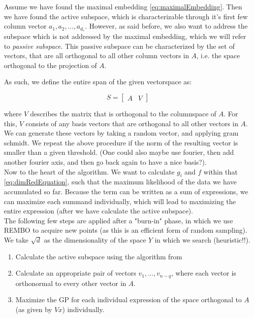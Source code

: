 Assume we have found the maximal embedding \ref{eq:maximalEmbedding}.
Then we have found the active subspace, which is characterizable through it's first few column vector $  a_1, a_2, ..., a_{d_e} $.
However, as said before, we also want to address the subspace which is not addressed by the maximal embedding, which we will refer to \textit{passive subspace}.
This passive subspace can be characterized by the set of vectors, that are all orthogonal to all other column vectors in $A$, i.e. the space orthogonal to the projection of $A$.

As such, we define the entire span of the given vectorspace as:

\begin{equation}
S = 
\begin{bmatrix}
A & V
\end{bmatrix}
\label{eq:entireSubspace}
\end{equation}

where $V$ describes the matrix that is orthogonal to the columnspace of $A$.
For this, $V$ consists of any basis vectors that are orthogonal to all other vectors in $A$.\\

We can generate these vectors by taking a random vector, and applying gram schmidt.
We repeat the above procedure if the norm of the resulting vector is smaller than a given threshold.
 (One could also maybe use fourier, then add another fourier axis, and then go back again to have a nice basis?). \\
 
 Now to the heart of the algorithm. 
 We want to calculate $g_i$ and $f$ within that \ref{eq:dimRedEquation}, such that the maximum likelihood of the data we have accumulated so far.
 Because the term can be written as a sum of expressions, we can maximize each summand individually, which will lead to maximizing the entire expression (after we have calculate the active subspace). \\
 
 The following few steps are applied after a "burn-in" phase, in which we use REMBO to acquire new points (as this is an efficient form of random sampling).
 We take $ \sqrt{d} $ as the dimensionality of the space $Y$ in which we search (heuristic!!).
 
 \begin{enumerate}
 \item Calculate the active subspace using the algorithm from 
 \item Calculate an appropriate pair of vectors $v_1, \ldots, v_{n-{q}}$, where each vector is orthonormal to every other vector in $A$.
 \item Maximize the GP for each individual expression of the space orthogonal to $A$ (as given by $V x$) individually.
 \end{enumerate}
 
